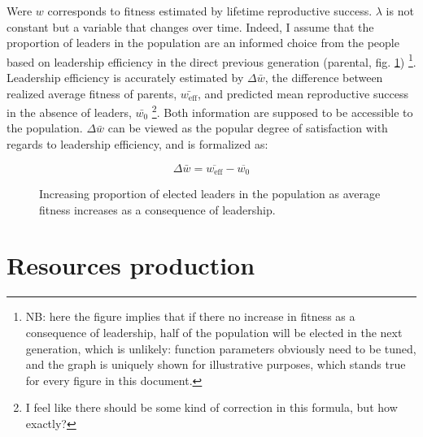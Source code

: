 \documentclass[a4paper]{article}
\begin{document}
Were $w$ corresponds to fitness estimated by lifetime reproductive success. $\lambda$ is not constant but a variable that changes over time. Indeed, I assume that the proportion of leaders in the population are an informed choice from the people based on leadership efficiency in the direct previous generation (parental, fig. \ref{fig:lambda}) \footnote{NB: here the figure implies that if there no increase in fitness as a consequence of leadership, half of the population will be elected in the next generation, which is unlikely: function parameters obviously need to be tuned, and the graph is uniquely shown for illustrative purposes, which stands true for every figure in this document.}. Leadership efficiency is accurately estimated by $\Delta\bar{w}$, the difference between realized average fitness of parents, $\bar{w_\text{eff}}$, and predicted mean reproductive success in the absence of leaders, $\bar{w_0}$ \footnote{I feel like there should be some kind of correction in this formula, but how exactly?}. Both information are supposed to be accessible to the population. $\Delta\bar{w}$ can be viewed as the popular degree of satisfaction with regards to leadership efficiency, and is formalized as:

\begin{equation}
	\Delta\bar{w}=\overline{w_\text{eff}}-\overline{w_0}
\end{equation}   

\begin{figure}[!htbp]
	\begin{center}
	\end{center}
	\caption{Increasing proportion of elected leaders in the population as average fitness increases as a consequence of leadership.}
	\label{fig:lambda}
\end{figure} 

\section{Resources production}
\label{sec:prod}
\end{document}
